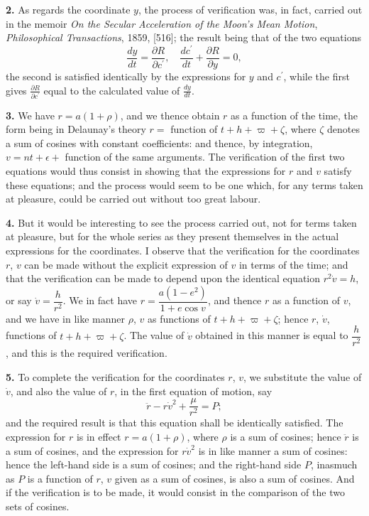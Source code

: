 \documentclass[11pt,a4paper]{book}
\begin{document}
\newpage
\textbf{2.} As regards the coordinate $y$, the process of verification was, in fact,
carried out in the memoir \textit{On the Secular Acceleration of the Moon's Mean Motion},
\textit{Philosophical Transactions}, 1859, [516]; the result being that of the two equations
\[
\frac{dy}{dt} = \frac{\partial R}{\partial c^\prime}, \quad \frac{dc^\prime}{dt} + \frac{\partial R}{\partial y} = 0,
\]
the second is satisfied identically by the expressions for $y$ and $c^\prime$, while the first gives
$\frac{\partial R}{\partial c^\prime}$ equal to the calculated value of $\frac{dy}{dt}$.

\textbf{3.} We have $r = a(1 + \rho)$, and we thence obtain $r$ as a function of the time, the
form being in Delaunay's theory $r =$ function of $t + h + \varpi + \zeta$, where $\zeta$ denotes a sum of
cosines with constant coefficients: and thence, by integration, $v = n t + \epsilon +$ function
of the same arguments. The verification of the first two equations would thus
consist in showing that the expressions for $r$ and $v$ satisfy these equations; and the
process would seem to be one which, for any terms taken at pleasure, could be
carried out without too great labour.

\textbf{4.} But it would be interesting to see the process carried out, not for terms
taken at pleasure, but for the whole series as they present themselves in the actual
expressions for the coordinates. I observe that the verification for the coordinates
$r$, $v$ can be made without the explicit expression of $v$ in terms of the time; and that
the verification can be made to depend upon the identical equation $r^2\dot{v} = h$, or say
$\dot{v} = \dfrac{h}{r^2}$. We in fact have $r = \dfrac{a(1-e^2)}{1+e\cos v}$, and thence $r$ as a function of $v$, and we
have in like manner $\rho$, $v$ as functions of $t + h + \varpi + \zeta$; hence $r$, $\dot{v}$, functions of
$t + h + \varpi + \zeta$. The value of $\dot{v}$ obtained in this manner is equal to $\dfrac{h}{r^2}$, and this is
the required verification.

\newpage
\textbf{5.} To complete the verification for the coordinates $r$, $v$, we substitute the
value of $\dot{v}$, and also the value of $r$, in the first equation of motion, say
\[
\ddot{r} - r\dot{v}^2 + \frac{\mu}{r^2} = P;
\]
and the required result is that this equation shall be identically satisfied. The
expression for $r$ is in effect $r = a(1 + \rho)$, where $\rho$ is a sum of cosines; hence $\ddot{r}$ is a sum
of cosines, and the expression for $r\dot{v}^2$ is in like manner a sum of cosines: hence the
left-hand side is a sum of cosines; and the right-hand side $P$, inasmuch as $P$ is a
function of $r$, $v$ given as a sum of cosines, is also a sum of cosines. And if the
verification is to be made, it would consist in the comparison of the two sets of
cosines.
\end{document}
